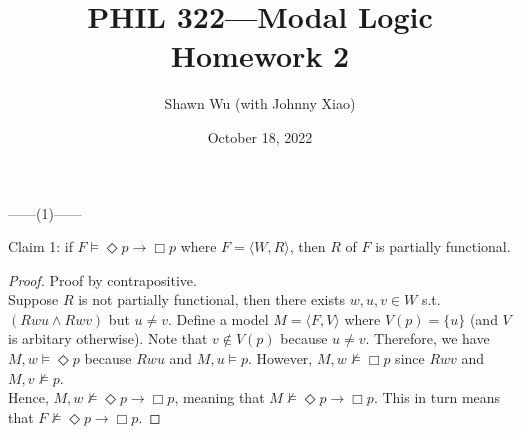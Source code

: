 \documentclass[12pt]{article}
\title{PHIL 322---Modal Logic \\Homework 2}
\author{Shawn Wu (with Johnny Xiao)}
\date{October 18, 2022}
\newcommand{\B}{\Box}
\newcommand{\D}{\Diamond}
\newcommand{\ns}{\nvDash}
\begin{document}
\maketitle
\noindent
\begin{center}
    ------(1)------
\end{center}
Claim 1: if $F \vDash \D p \rightarrow \B p$ where $F = \langle W, R \rangle$, then $R$ of $F$ is partially functional. 
\begin{proof} Proof by contrapositive.\\
    Suppose $R$ is not partially functional, then there exists $w, u, v \in W$ s.t. $(Rwu \land Rwv)$ but $u \neq v$.
    Define a model $M = \langle F, V \rangle$ where $V(p) = \{ u \}$ (and $V$ is arbitary otherwise). 
    Note that $v \notin V(p)$ because $u \neq v$.
    Therefore, we have $M, w \vDash \D p$ because $Rwu$ and $M, u \vDash p$.
    However, $M, w \nvDash \B p$ since $Rwv$ and $M, v \ns p$.\\
    Hence, $M, w \ns \D p \to \B p$, meaning that $M \ns \D p \to \B p$.
    This in turn means that $F \ns \D p \to \B p$.
\end{proof}
\end{document}
